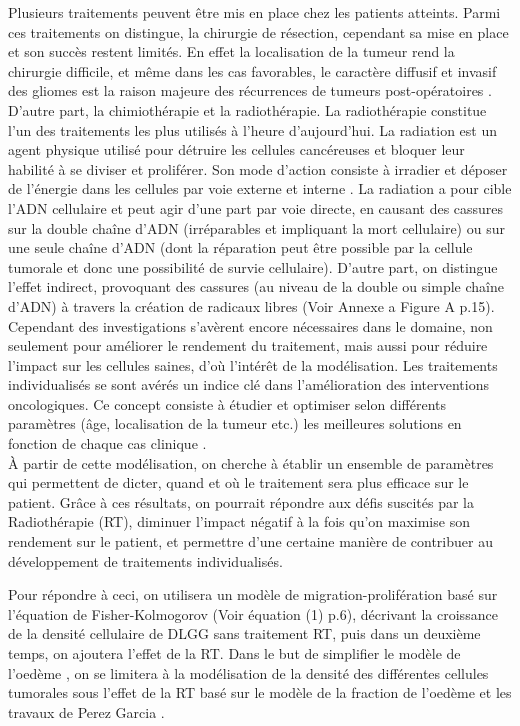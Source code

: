 \documentclass[12pt,a4paper]{article}
\begin{document}
Plusieurs traitements peuvent être mis en place chez les patients atteints. Parmi ces traitements on distingue, la chirurgie de résection, cependant sa mise en place et son succès restent limités. En effet la localisation de la tumeur rend la chirurgie difficile, et même dans les cas favorables, le caractère diffusif et invasif des gliomes est la raison majeure des récurrences de tumeurs post-opératoires \cite{f}. D’autre part, la chimiothérapie et la radiothérapie. La radiothérapie constitue l’un des traitements les plus utilisés à l’heure d’aujourd’hui. La radiation est un agent physique utilisé pour détruire les cellules cancéreuses et bloquer leur habilité à se diviser et proliférer. Son mode d’action consiste à irradier et déposer de l’énergie dans les cellules par voie externe et interne \cite{h}. La radiation a pour cible l'ADN cellulaire et peut agir d’une part par voie directe, en causant des cassures sur la double chaîne d’ADN (irréparables et impliquant la mort cellulaire) ou sur une seule chaîne d’ADN (dont la réparation peut être possible par la cellule tumorale et donc une possibilité de survie cellulaire). D’autre part, on distingue l’effet indirect, provoquant des cassures (au niveau de la double ou simple chaîne d’ADN) à travers la création de radicaux libres (Voir Annexe a Figure A p.15). Cependant des investigations s’avèrent encore nécessaires dans le domaine, non seulement pour améliorer le rendement du traitement, mais aussi pour réduire l’impact sur les cellules saines, d’où l’intérêt de la modélisation. Les traitements individualisés se sont avérés un indice clé dans l’amélioration des interventions oncologiques. Ce concept consiste à étudier et optimiser selon différents paramètres (âge, localisation de la tumeur etc.) les meilleures solutions en fonction de chaque cas clinique \cite{i}.\\

À partir de cette modélisation, on cherche à établir un ensemble de paramètres qui permettent de dicter, quand et où le traitement sera plus efficace sur le patient. Grâce à ces résultats, on pourrait répondre aux défis suscités par la Radiothérapie (RT), diminuer l’impact négatif à la fois qu’on maximise son rendement sur le patient, et permettre d’une certaine manière de contribuer au développement de traitements individualisés. 

Pour répondre à ceci, on utilisera un modèle de migration-prolifération basé sur l’équation de Fisher-Kolmogorov (Voir équation (1) p.6), décrivant la croissance de la densité cellulaire de DLGG sans traitement RT, puis dans un deuxième temps, on ajoutera l’effet de la RT. Dans le but de simplifier le modèle de l'oedème \cite{j}, on se limitera à la modélisation de la densité des différentes cellules tumorales sous l’effet de la RT basé sur le modèle de la fraction de l’oedème \cite{j} et les travaux de Perez Garcia \cite{k}. 
\end{document}
